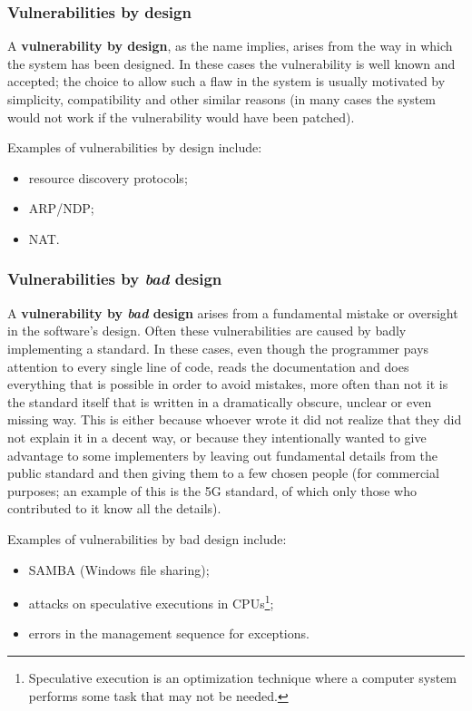 
\subsubsection*{Vulnerabilities by design}
A \textbf{vulnerability by design}, as the name implies, arises from the way in which the system has been designed. In these cases the vulnerability is well known and accepted; the choice to allow such a flaw in the system is usually motivated by simplicity, compatibility and other similar reasons (in many cases the system would not work if the vulnerability would have been patched).

Examples of vulnerabilities by design include:

\begin{itemize}
    \item resource discovery protocols;
    \item ARP/NDP;
    \item NAT.
\end{itemize}


\subsubsection*{Vulnerabilities by \textit{bad} design}
A \textbf{vulnerability by \textit{bad} design} arises from a fundamental mistake or oversight in the software's design. Often these vulnerabilities are caused by badly implementing a standard. In these cases, even though the programmer pays attention to every single line of code, reads the documentation and does everything that is possible in order to avoid mistakes, more often than not it is the standard itself that is written in a dramatically obscure, unclear or even missing way. This is either because whoever wrote it did not realize that they did not explain it in a decent way, or because they intentionally wanted to give advantage to some implementers by leaving out fundamental details from the public standard and then giving them to a few chosen people (for commercial purposes; an example of this is the 5G standard, of which only those who contributed to it know all the details).

Examples of vulnerabilities by bad design include:

\begin{itemize}
    \item SAMBA (Windows file sharing);
    \item attacks on speculative executions in CPUs\footnote{Speculative execution is an optimization technique where a computer system performs some task that may not be needed.};
    \item errors in the management sequence for exceptions.
\end{itemize}


